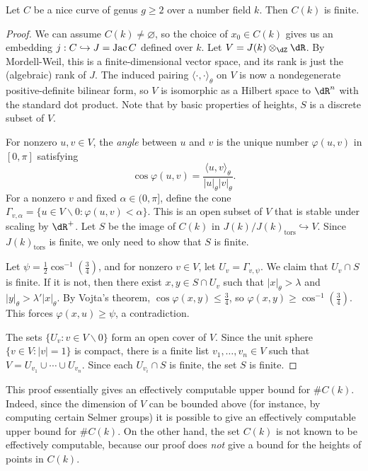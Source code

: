 \documentclass{article}
\begin{document}
\begin{theorem}[Faltings]
Let $C$ be a nice curve of genus $g\geqslant 2$ over a number field $k$. Then 
$C(k)$ is finite.
\end{theorem}
\begin{proof}
We can assume $C(k)\ne\varnothing$, so the choice of $x_0\in C(k)$ gives us an 
embedding $j:C\hookrightarrow J=\operatorname{Jac} C$ defined over $k$. Let 
$V=J(k)\otimes_\dZ\dR$. By Mordell-Weil, this is a finite-dimensional 
vector space, and its rank is just the (algebraic) rank of $J$. The induced 
pairing $\langle\cdot,\cdot\rangle_\theta$ on $V$ is now a nondegenerate 
positive-definite bilinear form, so $V$ is isomorphic as a Hilbert space to 
$\dR^n$ with the standard dot product. Note that by basic properties of 
heights, $S$ is a discrete subset of $V$. 

For nonzero $u,v\in V$, the \emph{angle} between $u$ and $v$ is the unique 
number $\varphi(u,v)$ in $[0,\pi]$ satisfying 
\[
  \cos\varphi(u,v) = \frac{\langle u,v\rangle_\theta}{|u|_\theta |v|_\theta} \text{.}
\]
For a nonzero $v$ and fixed $\alpha\in (0,\pi]$, define the cone 
$\Gamma_{v,\alpha} = \{u\in V\smallsetminus 0 : \varphi(u,v)<\alpha\}$. This is an open 
subset of $V$ that is stable under scaling by $\dR^+$. Let $S$ be the image of 
$C(k)$ in $J(k)/J(k)_\text{tors}\hookrightarrow V$. Since $J(k)_\text{tors}$ is 
finite, we only need to show that $S$ is finite. 

Let $\psi = \frac 1 2 \cos^{-1}(\frac 3 4)$, and for nonzero $v\in V$, let 
$U_v=\Gamma_{v,\psi}$. We claim that $U_v\cap S$ is finite. If it is not, 
then there exist $x,y\in S\cap U_v$  such that $|x|_\theta>\lambda$ and 
$|y|_\theta>\lambda'|x|_\theta$. By Vojta's theorem, 
$\cos\varphi(x,y)\leqslant \frac 3 4$, so 
$\varphi(x,y)\geqslant \cos^{-1}(\frac 3 4)$. This forces 
$\varphi(x,u)\geqslant \psi$, a contradiction. 

The sets $\{U_v:v\in V\smallsetminus 0\}$ form an open cover of $V$. Since the unit 
sphere $\{v\in V:|v|=1\}$ is compact, there is a finite list 
$v_1,\dots,v_n\in V$ such that $V=U_{v_1}\cup \cdots \cup U_{v_n}$. Since each 
$U_{v_i}\cap S$ is finite, the set $S$ is finite. 
\end{proof}

This proof essentially gives an effectively computable upper bound for 
$\# C(k)$. Indeed, since the dimension of $V$ can be bounded above (for 
instance, by computing certain Selmer groups) it is possible to give an 
effectively computable upper bound for $\# C(k)$. On the other hand, the set 
$C(k)$ is not known to be effectively computable, because our proof does 
\emph{not} give a bound for the heights of points in $C(k)$.
\end{document}
